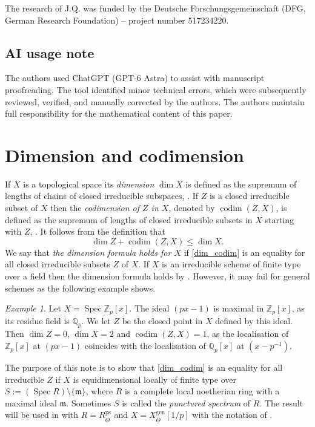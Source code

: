 \documentclass{amsart}
\theoremstyle{definition}
\theoremstyle{remark}
\newtheorem{examp}[prop]{Example}
\DeclareMathOperator{\Spec}{Spec}
\DeclareMathOperator{\codim}{codim}
\newcommand{\Qp}{\mathbb {Q}_p}
\newcommand{\Zp}{\ZZ_p}
\newcommand{\ZZ}{\mathbb Z}
\newcommand{\mm}{\mathfrak m}
\newcommand{\gen}{\mathrm{gen}}
\newcommand{\Thetabar}{\overline{\Theta}}
\newcommand{\ps}{\mathrm{ps}}
\begin{document}
The research of J.Q. was funded by the Deutsche Forschungsgemeinschaft (DFG, German Research Foundation) – project number 517234220. 

\subsection{AI usage note}
The authors used ChatGPT (GPT-6 Astra) to assist with manuscript proofreading. The tool identified minor  technical errors, which were subsequently reviewed, verified, and manually corrected by the authors. The authors maintain full responsibility for the mathematical content of this paper.
\section{Dimension and codimension}\label{sec_dim_codim}
If $X$ is a topological space its \textit{dimension} $\dim X$ is defined as the supremum of lengths of chains of 
closed irreducible subspaces, \cite[\href{https://stacks.math.columbia.edu/tag/0055}{Tag 0055}]{stacks-project}. If $Z$ is a closed irreducible subset of $X$ then the \textit{codimension  of $Z$ in $X$}, denoted by $\codim(Z, X)$,  is defined as the supremum of lengths 
of closed irreducible subsets in $X$ starting with $Z$, \cite[\href{https://stacks.math.columbia.edu/tag/02I3}{Tag 02I3}]{stacks-project}. It follows from the definition that 
\begin{equation}\label{dim_codim}
\dim Z+ \codim(Z, X)\le \dim X.
\end{equation} 
We say that \textit{the dimension formula holds for $X$} if \eqref{dim_codim} is an equality for all  closed irreducible subsets $Z$ of $X$.
If $X$ is an irreducible scheme  of finite type over a field 
then the dimension formula holds by \cite[Proposition 5.30]{GW1}. However, it may fail for general schemes as the following example shows.
\begin{examp} Let $X=\Spec \Zp[x]$. The ideal $(px-1)$ 
is maximal in $\Zp[x]$, as its residue field is $\Qp$. 
We let $Z$ be the closed point in $X$ defined by this ideal. Then $\dim Z=0$, $\dim X=2$ and  $\codim(Z, X)=1$, as the localisation of $\Zp[x]$ at $(px-1)$ 
coincides with the localisation of $\Qp[x]$ at $(x-p^{-1})$. 
\end{examp}
The purpose of this note is to show that \eqref{dim_codim} is an equality for all irreducible $Z$ if $X$ is equidimensional locally of finite 
type over $S:=(\Spec R)\setminus \{\mm\}$, where 
$R$ is a complete local noetherian ring with a maximal 
ideal $\mm$. Sometimes $S$ is called the \textit{punctured spectrum} of $R$. The result will be used in  with $R=R^{\ps}_{\Thetabar}$ and $X=X^{\gen}_{\Thetabar}[1/p]$ with the notation of .
\end{document}
